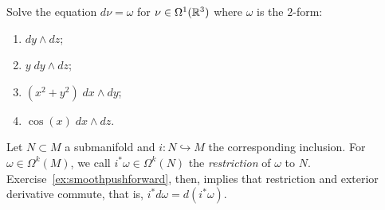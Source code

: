 \begin{exercise}
  Solve the equation $d \nu = \omega$ for $\nu \in \Omega^1(\mathbb{R}^3)$ where $\omega$ is the $2$-form:
  \begin{enumerate}
    \item $d y \wedge d z$;
    \item $y\; d y \wedge d z$;
    \item $(x^2 + y^2) \; d x \wedge d y$;
    \item $\cos(x)\; d x \wedge d z$.
  \end{enumerate}
\end{exercise}

Let $N\subset M$ a submanifold and $i:N\hookrightarrow M$ the corresponding inclusion.
For $\omega\in\Omega^k(M)$, we call $i^*\omega \in \Omega^k(N)$ the \emph{restriction} of $\omega$ to $N$.
Exercise~\ref{ex:smoothpushforward}, then, implies that restriction and exterior derivative commute, that is, $i^*d\omega = d(i^*\omega)$.

